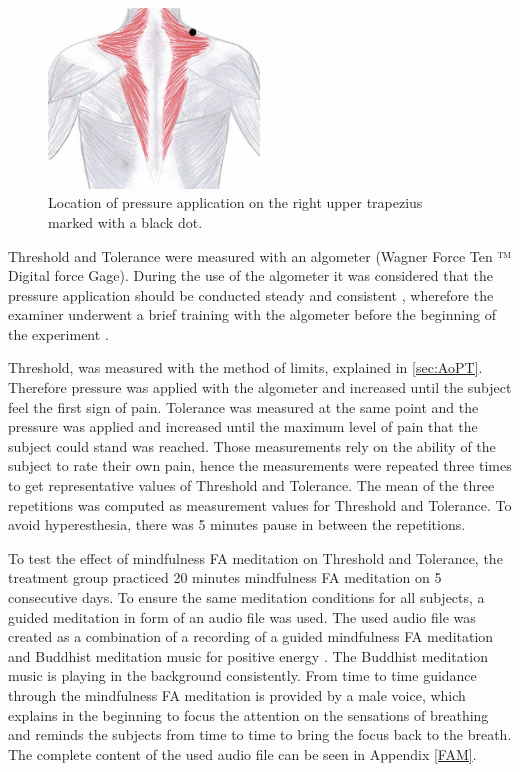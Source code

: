 \begin{figure}[H]
	\includegraphics[width=0.5\textwidth]{figures/trapezius} 
	\caption{Location of pressure application on the right
upper trapezius marked with a black dot.}
	\label{fig:trapezius}  
\end{figure}  

Threshold and Tolerance were measured with an algometer (Wagner Force Ten ™  Digital force Gage). During the use of the algometer it was considered that the pressure application should be conducted steady and consistent \cite{Fischer1987, Kinser2009}, wherefore the examiner underwent a brief training with the algometer before the beginning of the experiment \cite{ Kinser2009, Vaughan2007}. 

Threshold, was measured with the method of limits, explained in \autoref{sec:AoPT}. Therefore pressure was applied with the algometer and increased until the subject feel the first sign of pain. Tolerance was measured at the same point and the pressure was applied and increased until the maximum level of pain that the subject could stand was reached. Those measurements rely on the ability of the subject to rate their own pain, hence the measurements were repeated three times to get representative values of Threshold and Tolerance.  The mean of the three repetitions was computed as measurement values for Threshold and Tolerance. To avoid hyperesthesia, there was 5 minutes pause in between the repetitions. 

To test the effect of mindfulness FA meditation on Threshold and Tolerance, the treatment group practiced 20 minutes mindfulness FA meditation on 5 consecutive days. To ensure the same meditation conditions for all subjects, a guided meditation in form of an audio file was used. The used audio file was created as a combination of a recording of a guided mindfulness FA meditation \cite{Noyce2018} and Buddhist meditation music for positive energy \cite{BuddhistMusic}. The Buddhist meditation music is playing in the background consistently. From time to time guidance through the mindfulness FA meditation is provided by a male voice, which explains in the beginning to focus the attention on the sensations of breathing and reminds the subjects from time to time to bring the focus back to the breath. The complete content of the used audio file can be seen in Appendix \ref{FAM}.

